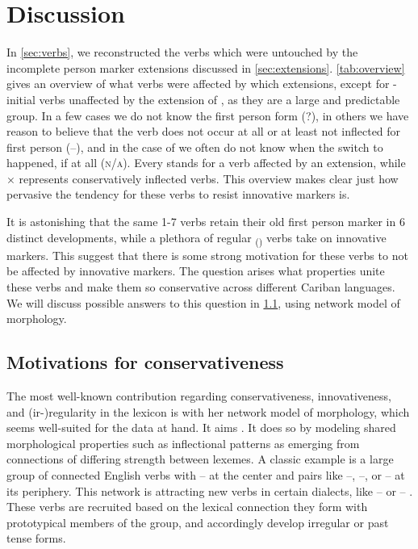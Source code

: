 \section{Discussion}
\label{sec:discussion}
In \cref{sec:verbs}, we reconstructed the verbs which were untouched by the incomplete person marker extensions discussed in \cref{sec:extensions}.
\cref{tab:overview} gives an overview of what verbs were affected by which extensions, except for -initial \akuriyo verbs unaffected by the extension of , as they are a large and predictable group.
In a few cases we do not know the first person form (?), in others we have reason to believe that the verb does not occur at all or at least not inflected for first person (–), and in the case of  we often do not know when the switch to  happened, if at all (\textsc{n/a}).
Every \checkmark stands for a verb affected by an extension, while × represents conservatively inflected verbs.
This overview makes clear just how pervasive the tendency for these verbs to resist innovative markers is.



It is astonishing that the same 1-7 verbs retain their old first person marker in 6 distinct developments, while a plethora of regular \textsubscript{()} verbs take on innovative markers.
This suggest that there is some strong motivation for these verbs to not be affected by innovative markers.
The question arises what properties unite these verbs and make them so conservative across different Cariban languages.
We will discuss possible answers to this question in \cref{sec:motivations}, using  network model of morphology.

\subsection{Motivations for conservativeness}
\label{sec:motivations}
The most well-known contribution regarding conservativeness, innovativeness, and (ir-){}re\-gu\-la\-ri\-ty in the lexicon is \textcite{bybee1985morphology} with her network model of morphology, which seems well-suited for the data at hand.
It aims  \parencite[428]{bybee1995regular}.
It does so by modeling shared morphological properties such as inflectional patterns as emerging from connections of differing strength between lexemes.
A classic example is a large group of connected  English verbs with -- at the center and pairs like --, --, or -- at its periphery.
This network is attracting new verbs in certain dialects, like -- or -- \parencite[129--130]{bybee1985morphology}.
These verbs are recruited based on the lexical connection they form with prototypical members of the group, and accordingly develop irregular or  past tense forms.

